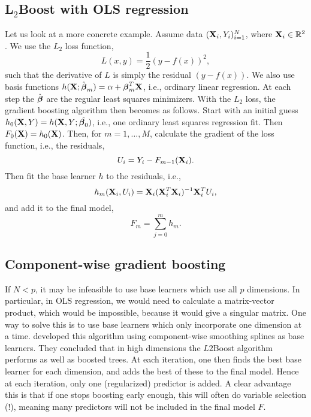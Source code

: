 \subsection{L$_2$Boost with OLS regression}
Let us look at a more concrete example. Assume data $(\mathbf{X}_i,Y_i)_{i=1}^N$, where $\mathbf{X}_i\in\mathbb{R}^2$. We use the $L_2$ loss function,
\begin{equation}\label{l2}
    L(x,y)=\frac{1}{2}\left(y-f(x)\right)^2,
\end{equation}
such that the derivative of $L$ is simply the residual $(y-f(x))$. We also use basis functions $h(\mathbf{X};\hat{\boldsymbol{\beta}}_m)=\alpha + \boldsymbol{\beta}_m^T\mathbf{X}$, i.e., ordinary linear regression. At each step the $\hat{\boldsymbol{\beta}}$ are the regular least squares minimizers. With the $L_2$ loss, the gradient boosting algorithm then becomes as follows. Start with an initial guess $h_0(\mathbf{X},Y)=h(\mathbf{X},Y;\hat{\boldsymbol{\beta}_0})$, i.e., one ordinary least squares regression fit. Then $F_0(\mathbf{X})=h_0(\mathbf{X})$. Then, for $m=1,\dotsc,M$, calculate the gradient of the loss function, i.e., the residuals,
\begin{equation}\label{residuals}
    U_i=Y_i-F_{m-1}(\mathbf{X}_i).
\end{equation}
Then fit the base learner $h$ to the residuals, i.e.,
\begin{equation}
    h_m(\mathbf{X}_i,U_i)=\mathbf{X}_i(\mathbf{X}_i^T\mathbf{X}_i)^{-1}\mathbf{X}_i^TU_i,
\end{equation}
and add it to the final model,
\begin{equation}
    F_m=\sum_{j=0}^m h_m.
\end{equation}

\subsection{Component-wise gradient boosting}
If $N < p$, it may be infeasible to use base learners which use all $p$ dimensions. In particular, in OLS regression, we would need to calculate a matrix-vector product, which would be impossible, because it would give a singular matrix. One way to solve this is to use base learners which only incorporate one dimension at a time. \cite{buhlmann-yu} developed this algorithm using component-wise smoothing splines as base learners. They concluded that in high dimensions the $L2$Boost algorithm performs as well as boosted trees. At each iteration, one then finds the best base learner for each dimension, and adds the best of these to the final model. Hence at each iteration, only one (regularized) predictor is added. A clear advantage this is that if one stops boosting early enough, this will often do variable selection (!), meaning many predictors will not be included in the final model $F$.



